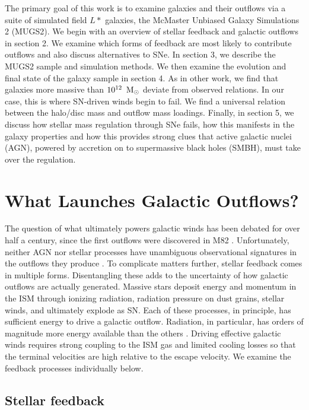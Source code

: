 The primary goal of this work is to examine galaxies and their outflows via a suite of
simulated field $L*$ galaxies, the McMaster Unbiased Galaxy Simulations 2
(MUGS2).  We begin with an overview of stellar feedback and galactic outflows
in section 2.  We examine which forms of feedback are most likely to
contribute outflows and also discuss alternatives to SNe.  In section
3,  we describe the MUGS2 sample and simulation methods.  We then examine the
evolution and final state of the galaxy sample in section 4.   As in other work,
we find that galaxies more massive than $10^{12}\;\>{\rm M_{\odot}}$ deviate from observed
relations.  In our case, this is where SN-driven winds begin to fail.  We
find a universal relation between the halo/disc mass and outflow mass loadings.
Finally, in section 5, we discuss how stellar mass regulation through SNe
fails, how this manifests in the galaxy properties and how this provides strong
clues that active galactic nuclei (AGN), powered by accretion on to
supermassive black holes (SMBH), must take over the regulation.

\section{What Launches Galactic Outflows?}
The question of what ultimately powers galactic winds has been debated for over
half a century, since the first outflows were discovered in M82
\citep{Lynds1963}.  Unfortunately, neither AGN nor
stellar processes have unambiguous observational signatures in the outflows they
produce \citep{Veilleux2005}.  To complicate matters further, stellar feedback
comes in multiple forms.  Disentangling these adds to the uncertainty of how
galactic outflows are actually generated.  Massive stars deposit energy and
momentum in the ISM through ionizing radiation, radiation pressure on dust
grains, stellar winds, and ultimately explode as SN.  Each of these
processes, in principle, has sufficient energy to drive a galactic outflow.
Radiation, in particular, has orders of magnitude more energy available than the
others \citep{Leitherer1999}.  Driving effective galactic winds requires strong
coupling to the ISM gas and limited cooling losses so that the terminal velocities
are high relative to the escape velocity.  We examine the feedback processes
individually below.

\subsection{Stellar feedback}
